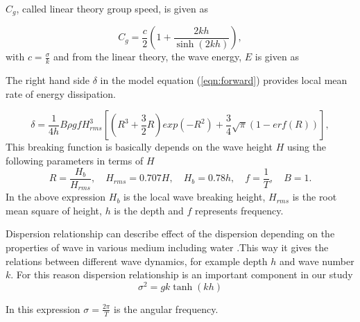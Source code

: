 $C_g$, called linear theory group speed, is given as

\begin{equation}
\label{cg}
C_g=\frac{c}{2}\left(1+\frac{2kh}{\sinh(2kh)}\right),
\end{equation}
with $c=\frac{\sigma}{k}$ and from the linear theory, the wave energy, $E$ is given as

The right hand side ${\delta}$ in the model equation (\ref{eqn:forward}) provides local mean rate of energy dissipation.  

\begin{equation}\label{eqn:dissipation}
\delta = \frac{1}{4h}B\rho g f H_{rms}^3\left[(R^3+\frac{3}{2}R)exp(-R^2)+\frac{3}{4}\sqrt{\pi}(1-erf(R))\right],
\end{equation}
This breaking function is basically depends on the wave height ${H}$ using the following parameters in terms of ${H}$\\
$$R=\frac{H_b}{H_{rms}}, \quad H_{rms} = 0.707H,\quad H_b=0.78h,\quad f=\frac{1}{T},\quad B=1.$$
In the above expression ${H_{b}}$ is the local wave breaking height, ${H_{rms}}$ is the root mean square of height, ${h}$ is the depth and ${f}$ represents frequency.

Dispersion relationship can describe effect of the dispersion depending on the properties of wave in various medium including water .This way it gives the relations between different wave dynamics, for example depth ${h}$ and wave number ${k}$. For this reason dispersion relationship is an important component in our study
\begin{equation}\label{eqn:dispersion}
\sigma^2=gk\tanh(kh)
\end{equation}

In this expression ${\sigma=\frac{2\pi}{T}}$ is the angular frequency.  







